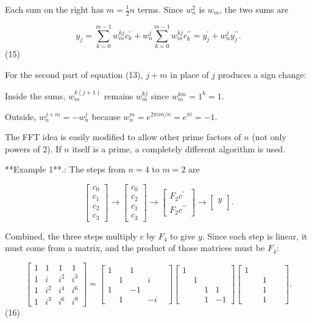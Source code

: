Each sum on the right has \(m=\frac{1}{2}n\) terms. Since \(w_{n}^{2}\) is \(w_{m}\), the two sums are

\[y_{j}=\sum_{k=0}^{m-1}w_{m}^{kj}c_{k}^{\prime}+w_{n}^{j}\sum_{k=0}^{m-1}w_{m}^{kj }c_{k}^{\prime\prime}=y_{j}^{\prime}+w_{n}^{j}y_{j}^{\prime\prime}.\] (15)

For the second part of equation (13), \(j+m\) in place of \(j\) produces a sign change:

Inside the sums, \(w_{m}^{k(j+1)}\) remains \(w_{m}^{kj}\) since \(w_{m}^{km}=1^{k}=1\).

Outside, \(w_{n}^{j+m}=-w_{n}^{j}\) because \(w_{n}^{m}=e^{2\pi im/n}=e^{\pi i}=-1\).

The FFT idea is easily modified to allow other prime factors of \(n\) (not only powers of 2). If \(n\) itself is a prime, a completely different algorithm is used.

**Example 1**.: The steps from \(n=4\) to \(m=2\) are

\[\begin{bmatrix}c_{0}\\ c_{1}\\ c_{2}\\ c_{3}\end{bmatrix}\to\begin{bmatrix}c_{0}\\ c_{2}\\ c_{1}\\ c_{3}\end{bmatrix}\to\begin{bmatrix}F_{2}c^{\prime}\\ F_{2}c^{\prime\prime}\end{bmatrix}\to\begin{bmatrix}y\\ \end{bmatrix}.\]

Combined, the three steps multiply \(c\) by \(F_{4}\) to give \(y\). Since each step is linear, it must come from a matrix, and the product of those matrices must be \(F_{4}\):

\[\begin{bmatrix}1&1&1&1\\ 1&i&i^{2}&i^{3}\\ 1&i^{2}&i^{4}&i^{6}\\ 1&i^{3}&i^{6}&i^{9}\end{bmatrix}=\begin{bmatrix}1&&1&&\\ &1&&i\\ 1&&-1&&\\ &1&&-i\end{bmatrix}\begin{bmatrix}1&&\\ &1&&\\ &&1&1\\ &&1&-1\end{bmatrix}\begin{bmatrix}1&&\\ &&1&\\ &&1&&\\ &&1\end{bmatrix}.\] (16)

